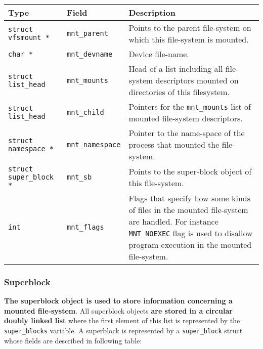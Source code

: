 \documentclass[10pt,a4paper]{article}
\begin{document}
\begin{center}
\begin{tabular}{l|l|p{13cm}} 

\toprule
Type & Field & Description \\
\midrule

\texttt{struct vfsmount *} & \texttt{mnt\_parent} & Points to the parent file-system on which this file-system is mounted.\\
\texttt{char *} & \texttt{mnt\_devname} & Device file-name.\\
\texttt{struct list\_head} & \texttt{mnt\_mounts} & Head of a list including all file-system descriptors mounted on directories of this filesystem. \\
\texttt{struct list\_head} & \texttt{mnt\_child} & Pointers for the \texttt{mnt\_mounts} list of mounted file-system descriptors. \\
\texttt{struct namespace *} & \texttt{mnt\_namespace} & Pointer to the name-space of the process that mounted the file-system. \\
\texttt{struct super\_block *} & \texttt{mnt\_sb} & Points to the super-block object of this file-system.\\
\texttt{int} & \texttt{mnt\_flags} & Flags that specify how some kinds of files in the mounted file-system are handled. For instance \texttt{MNT\_NOEXEC} flag is used to disallow program execution in the mounted file-system.\\

\bottomrule
\end{tabular}
\end{center}

\subsubsection{Superblock}

\textbf{The superblock object is used to store information concerning a mounted file-system}. All superblock objects \textbf{are stored in a circular doubly linked list} where the first element of this list is represented by the \texttt{super\_blocks} variable. A superblock is represented by a \texttt{super\_block} struct whose fields are described in following table:
\end{document}

